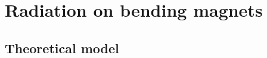\documentclass{beamer}
\begin{document}
% 
% 
% 


\section{Radiation on bending magnets}
\subsection{Theoretical model}
\end{document}
